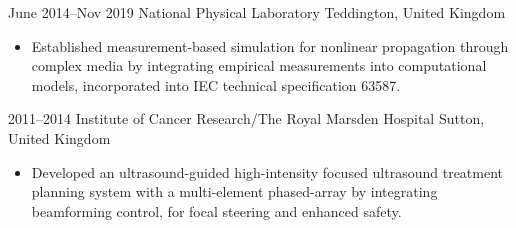 \documentclass[english, print]{cv-style-wide}
\begin{document}
\begin{entrylist}
\entry
  {June 2014--Nov 2019}
  {National Physical Laboratory}
  {Teddington, United Kingdom}
  {
  \begin{itemize}
\item Established measurement-based simulation for nonlinear propagation through complex media by integrating empirical measurements into computational models, incorporated into IEC technical specification 63587.
  \end{itemize}}


\entry
  {2011--2014}
  {Institute of Cancer Research/The Royal Marsden Hospital}
  {Sutton, United Kingdom}
  {
    \begin{itemize}
    \item Developed an ultrasound-guided high-intensity focused ultrasound treatment planning system with a multi-element phased-array by integrating beamforming control, for focal steering and enhanced safety.
    \end{itemize}}


\end{entrylist}
\end{document}
